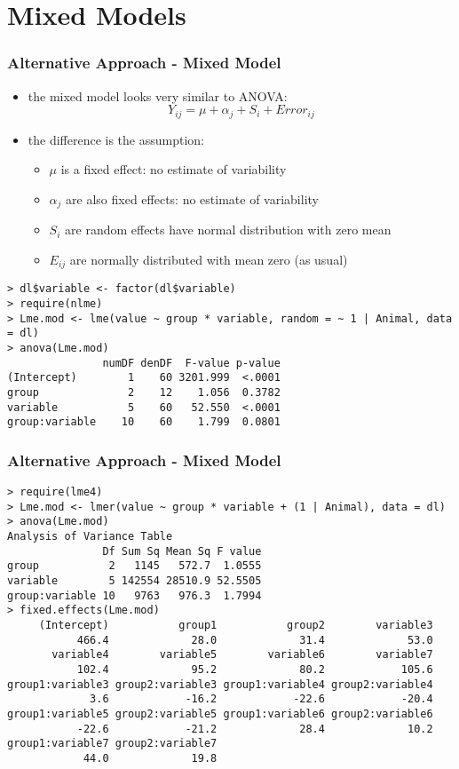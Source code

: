 \section{Mixed Models}
\begin{frame}\frametitle{Alternative Approach - Mixed Model}
  \begin{itemize}
  \item the mixed model looks very similar to ANOVA: $$Y_{ij} = \mu + \alpha_j + S_i + Error_{ij}$$
  \item the difference is the assumption:
    \begin{itemize}
    \item $\mu$ is a fixed effect: no estimate of variability
    \item $\alpha_j$ are also fixed effects: no estimate of variability
    \item $S_i$ are random effects have normal distribution with zero mean
    \item $E_{ij}$ are normally distributed with mean zero (as usual)
    \end{itemize}
  \end{itemize}\scriptsize
\begin{verbatim}
> dl$variable <- factor(dl$variable)
> require(nlme)
> Lme.mod <- lme(value ~ group * variable, random = ~ 1 | Animal, data = dl)
> anova(Lme.mod)
               numDF denDF  F-value p-value
(Intercept)        1    60 3201.999  <.0001
group              2    12    1.056  0.3782
variable           5    60   52.550  <.0001
group:variable    10    60    1.799  0.0801
\end{verbatim}
\end{frame}

\begin{frame}\frametitle{Alternative Approach - Mixed Model}
  \scriptsize
\begin{verbatim}
> require(lme4)
> Lme.mod <- lmer(value ~ group * variable + (1 | Animal), data = dl)
> anova(Lme.mod)
Analysis of Variance Table
               Df Sum Sq Mean Sq F value
group           2   1145   572.7  1.0555
variable        5 142554 28510.9 52.5505
group:variable 10   9763   976.3  1.7994
> fixed.effects(Lme.mod)
     (Intercept)           group1           group2        variable3 
           466.4             28.0             31.4             53.0 
       variable4        variable5        variable6        variable7 
           102.4             95.2             80.2            105.6 
group1:variable3 group2:variable3 group1:variable4 group2:variable4 
             3.6            -16.2            -22.6            -20.4 
group1:variable5 group2:variable5 group1:variable6 group2:variable6 
           -22.6            -21.2             28.4             10.2 
group1:variable7 group2:variable7 
            44.0             19.8 
\end{verbatim}
\end{frame}


